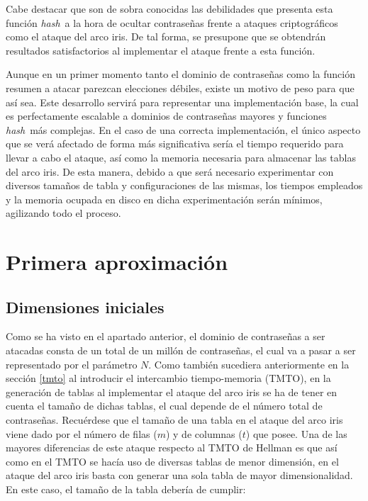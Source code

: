 \documentclass[12pt,spanish,listoffigures,listoftables,listofalgorithms]{tfgetsinf}
\newcommand{\hash}{\textit{hash}}
\begin{document}
Cabe destacar que son de sobra conocidas las debilidades que presenta esta función \hash~a la hora de ocultar contraseñas frente a ataques criptográficos como el ataque del arco iris. De tal forma, se presupone que se obtendrán resultados satisfactorios al implementar el ataque frente a esta función.

Aunque en un primer momento tanto el dominio de contraseñas como la función resumen a atacar parezcan elecciones débiles, existe un motivo de peso para que así sea. Este desarrollo servirá para representar una implementación base, la cual es perfectamente escalable a dominios de contraseñas mayores y funciones \hash~más complejas. En el caso de una correcta implementación, el único aspecto que se verá afectado de forma más significativa sería el tiempo requerido para llevar a cabo el ataque, así como la memoria necesaria para almacenar las tablas del arco iris. De esta manera, debido a que será necesario experimentar con diversos tamaños de tabla y configuraciones de las mismas, los tiempos empleados y la memoria ocupada en disco en dicha experimentación serán mínimos, agilizando todo el proceso.

\section{Primera aproximación}

\subsection{Dimensiones iniciales}

Como se ha visto en el apartado anterior, el dominio de contraseñas a ser atacadas consta de un total de un millón de contraseñas, el cual va a pasar a ser representado por el parámetro $N$. Como también sucediera anteriormente en la sección \ref{tmto} al introducir el intercambio tiempo-memoria (TMTO), en la generación de tablas al implementar el ataque del arco iris se ha de tener en cuenta el tamaño de dichas tablas, el cual depende de el número total de contraseñas. Recuérdese que el tamaño de una tabla en el ataque del arco iris viene dado por el número de filas ($m$) y de columnas ($t$) que posee. Una de las mayores diferencias de este ataque respecto al TMTO de Hellman es que así como en el TMTO se hacía uso de diversas tablas de menor dimensión, en el ataque del arco iris basta con generar una sola tabla de mayor dimensionalidad. En este caso, el tamaño de la tabla debería de cumplir:
\end{document}
